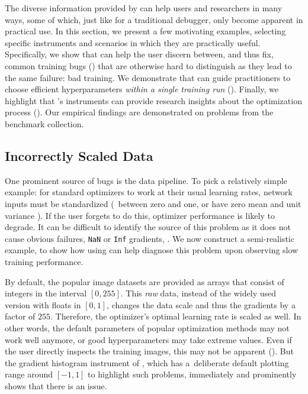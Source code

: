 The diverse information provided by \cockpit can help users and researchers in
many ways, some of which, just like for a traditional debugger, only become
apparent in practical use. In this section, we present a few motivating
examples, selecting specific instruments and scenarios in which they are
practically useful. Specifically, we show that \cockpit can help the user
discern between, and thus fix, common training bugs
() that are otherwise
hard to distinguish as they lead to the same failure: bad training. We
demonstrate that \cockpit can guide practitioners to choose efficient
hyperparameters \emph{within a single training run}
(). Finally, we highlight that
\cockpit's instruments can provide research insights about the optimization
process (). Our empirical findings are demonstrated on
problems from the \deepobs \citep{schneider2019deepobs} benchmark collection.

\subsection{Incorrectly Scaled Data}\label{cockpit::sec:misscaled_data_exp}
One prominent source of bugs is the data pipeline. To pick a relatively simple
example: for standard optimizers to work at their usual learning rates, network
inputs must be standardized (\ie~between zero and one, or have zero mean and
unit variance \citep[\eg][]{bengio2012neural}). If the user forgets to do this,
optimizer performance is likely to degrade. It can be difficult to identify the
source of this problem as it does not cause obvious failures, \texttt{NaN} or
\texttt{Inf} gradients, \etc. We now construct a semi-realistic example, to show
how using \cockpit can help diagnose this problem upon observing slow training
performance.

By default, the popular image datasets \cifartenhun
\citep{krizhevsky2009learning} are provided as \numpy \citep{harris2020array}
arrays that consist of integers in the interval $[0,255]$. This \emph{raw} data,
instead of the widely used version with floats in $[0,1]$, changes the data
scale and thus the gradients by a factor of $255$. Therefore, the optimizer's
optimal learning rate is scaled as well. In other words, the default parameters
of popular optimization methods may not work well anymore, or good
hyperparameters may take extreme values. Even if the user directly inspects the
training images, this may not be apparent
(). But the gradient histogram instrument
of \cockpit, which has a deliberate default plotting range around $[-1,1]$ to
highlight such problems, immediately and prominently shows that there is an
issue.

